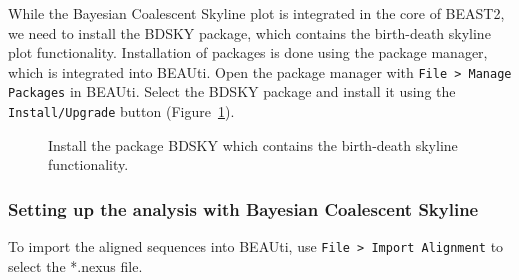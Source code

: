 \documentclass[11pt]{article}
\begin{document}
While the Bayesian Coalescent Skyline plot is integrated in the core of BEAST2, we need to install the BDSKY package, which contains the birth-death skyline plot functionality. Installation of packages is done using the package manager, which is integrated into BEAUti. Open the package manager with \texttt{File > Manage Packages} in BEAUti. Select the BDSKY package and install it using the \texttt{Install/Upgrade} button (Figure~\ref{fig:install}).


\begin{figure}[h!]
\centering
{}
\caption{\small Install the package BDSKY which contains the birth-death skyline functionality.}
\label{fig:install}
\end{figure}

\subsubsection{Setting up the analysis with Bayesian Coalescent Skyline}

To import the aligned sequences into BEAUti, use \texttt{File > Import Alignment} to select the *.nexus file.

\end{document}
